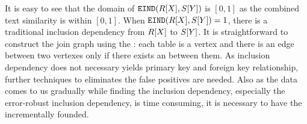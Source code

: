 It is easy to see that the domain of $\texttt{EIND}(R[X],S[Y])$ is $[0,1]$ as the combined text similarity is within $[0,1]$. When $\texttt{EIND}(R[X],S[Y])=1$, there is a traditional inclusion dependency from $R[X]$ to $S[Y]$. It is straightforward to construct the join graph using the \eind: each table is a vertex and there is an edge between two vertexes only if there exists an \eind between them. As inclusion dependency does not necessary yields primary key and foreign key relationship, further techniques to eliminates the false positives are needed. Also as the data comes to us gradually while finding the inclusion dependency, especially the error-robust inclusion dependency, is time consuming, it is necessary to have the \eind incrementally founded. %










\iffalse
\subsection{Query the Join Graph}\label{subsec:query}

Once the join graph is constructed, the users can query it in various way. Among them, one of the most important one is to.

The essential way to query the join graph is taking several vertexes and find an subgraph containing all the query vertexes.

The user can specify several attributes which compose a \emph{query schema}. 

Given a collection of attributes, we aim to find a subgraph that contains all the corresponding vertexes. 

\fi